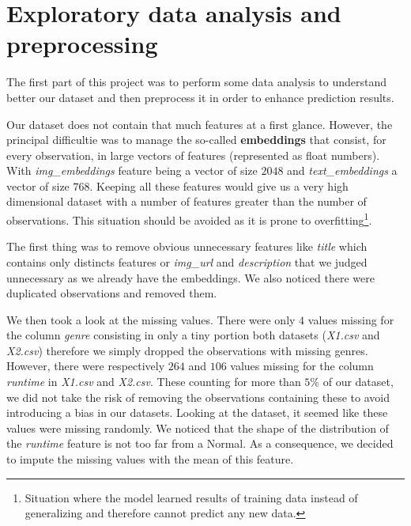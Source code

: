 \section{Exploratory data analysis and preprocessing}

The first part of this project was to perform some data analysis to understand better our dataset and then preprocess it in order to enhance prediction results.

Our dataset does not contain that much features at a first glance. However, the principal difficultie was to manage the so-called \textbf{embeddings} that consist, for every observation, in large vectors of features (represented as float numbers). With \textit{img\_embeddings} feature being a vector of size $2048$ and \textit{text\_embeddings} a vector of size $768$. Keeping all these features would give us a very high dimensional dataset with a number of features greater than the number of observations. This situation should be avoided as it is prone to overfitting\footnote{Situation where the model learned results of training data instead of generalizing and therefore cannot predict any new data.}. 

The first thing was to remove obvious unnecessary features like \textit{title} which contains only distincts features or \textit{img\_url} and \textit{description} that we judged unnecessary as we already have the embeddings. We also noticed there were duplicated observations and removed them.

We then took a look at the missing values. There were only $4$ values missing for the column \textit{genre} consisting in only a tiny portion both datasets (\textit{X1.csv} and \textit{X2.csv}) therefore we simply dropped the observations with missing genres. However, there were respectively $264$ and $106$ values missing for the column \textit{runtime} in \textit{X1.csv} and \textit{X2.csv}. These counting for more than $5\%$ of our dataset, we did not take the risk of removing the observations containing these to avoid introducing a bias in our datasets. Looking at the dataset, it seemed like these values were missing randomly. We noticed that the shape of the distribution of the \textit{runtime} feature is not too far from a Normal. As a consequence, we decided to impute the missing values with the mean of this feature.

